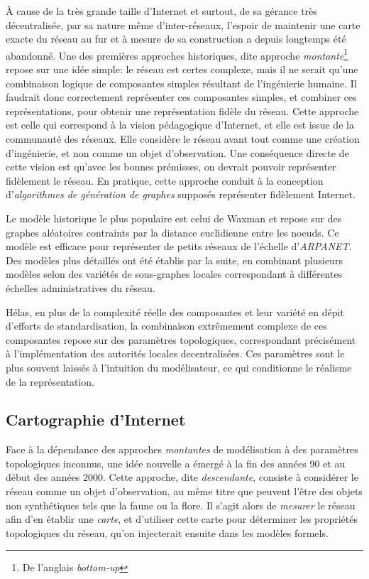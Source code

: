 À cause de la très grande taille d'Internet et surtout, de sa gérance très
décentralisée, par sa nature même d'inter-réseaux, l'espoir de maintenir une
carte exacte du réseau au fur et à mesure de sa construction a depuis longtemps
été abandonné. Une des premières approches historiques, dite approche {\em
montante}\footnote{De l'anglais {\em bottom-up}} repose sur une idée simple:
le réseau est certes complexe, mais il ne serait qu'une combinaison logique de
composantes simples résultant de l'ingénierie humaine. Il faudrait donc
correctement représenter ces composantes simples, et combiner ces
représentations, pour obtenir une représentation fidèle du réseau. Cette
approche est celle qui correspond à la vision pédagogique d'Internet, et elle
est issue de la communauté des réseaux. Elle considère le réseau avant tout
comme une création d'ingénierie, et non comme un objet
d'observation. Une conséquence directe de cette vision est qu'avec les bonnes
prémisses, on devrait pouvoir représenter fidèlement le réseau. En pratique,
cette approche conduit à la conception d'{\em algorithmes de génération de
graphes} supposés représenter fidèlement Internet.

Le modèle historique le plus populaire est celui de Waxman
\etal\cite{waxman1988routing} et repose sur des graphes aléatoires contraints
par la distance euclidienne entre les noeuds. Ce modèle est efficace pour
représenter de petits réseaux de l'échelle d'{\em ARPANET}. Des modèles plus
détaillés\cite{doar1996better,zegura1997quantitative} ont été établis par la
suite, en combinant plusieurs modèles selon des variétés de sous-graphes locales
correspondant à différentes échelles administratives du réseau.

Hélas, en plus de la complexité réelle des composantes et leur variété en dépit
d'efforts de standardisation, la combinaison extrêmement complexe de ces
composantes repose sur des paramètres topologiques, correspondant précisément à
l'implémentation des autorités locales decentralisées. Ces paramètres sont le
plus souvent laissés à l'intuition du modélisateur, ce qui conditionne le
réalisme de la représentation.\cite{paxson1997we}

\subsection{Cartographie d'Internet}
\label{subsec:intro-maps}

Face à la dépendance des approches {\em montantes} de modélisation à des
paramètres topologiques inconnus, une idée nouvelle a émergé à la fin des années
90 et au début des années 2000. Cette approche, dite {\em descendante}, consiste
à considérer le réseau comme un objet d'observation, au même titre que peuvent
l'être des objets non synthétiques tels que la faune ou la flore. Il s'agit
alors de {\em mesurer} le réseau afin d'en établir une {\em carte}, et
d'utiliser cette carte pour déterminer les propriétés topologiques du réseau,
qu'on injecterait ensuite dans les modèles formels.

